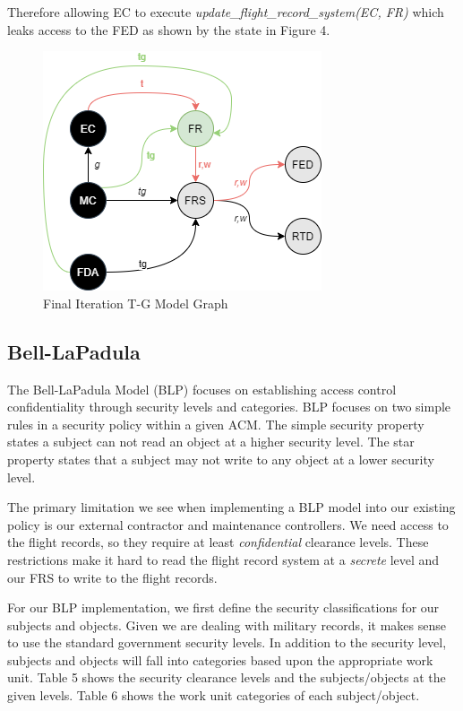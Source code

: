 \documentclass[10pt,journal,compsoc]{IEEEtran}
\begin{document}
Therefore allowing EC to execute \textit{update\_flight\_record\_system(EC, FR)} which leaks access to the FED as shown by the state in Figure 4.

\begin{figure}[t]
  \caption{Final Iteration T-G Model Graph} 
  \includegraphics[scale=0.7]{TGModel4.png}
\end{figure}

\subsection{Bell-LaPadula}
The Bell-LaPadula Model (BLP) focuses on establishing access control confidentiality through security levels and categories. 
BLP focuses on two simple rules in a security policy within a given ACM. 
The simple security property states a subject can not read an object at a higher security level. 
The star property states that a subject may not write to any object at a lower security level.

The primary limitation we see when implementing a BLP model into our existing policy is our external contractor and maintenance controllers. We need access to the flight records, so they require at least \textit{confidential} clearance levels. These restrictions make it hard to read the flight record system at a \textit{secrete} level and our FRS to write to the flight records. 

For our BLP implementation, we first define the security classifications for our subjects and objects. Given we are dealing with military records, it makes sense to use the standard government security levels. In addition to the security level, subjects and objects will fall into categories based upon the appropriate work unit.  
Table 5 shows the security clearance levels and the subjects/objects at the given levels.
Table 6 shows the work unit categories of each subject/object.
\end{document}
